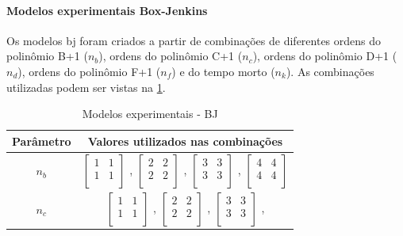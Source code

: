 \paragraph*{\textbf{Modelos experimentais Box-Jenkins}}
\label{par:modelos_experimentais_bj}

Os modelos \acrshort{bj} foram criados a partir de combinações de diferentes ordens do polinômio B+1 ($n_b$),
ordens do polinômio C+1 ($n_c$), ordens do polinômio D+1 ($n_d$), ordens do polinômio F+1 ($n_f$)
e do tempo morto ($n_k$). As combinações utilizadas podem ser vistas na
\cref{tab:tclabsp-models-bj}.

\begin{table}[h]
	\centering
	\caption{Modelos experimentais - BJ}
	\label{tab:tclabsp-models-bj}
	\begin{tabular}{c|c} \toprule
		{Parâmetro}		&	{Valores utilizados nas combinações}									\\ \midrule
		$n_b$			&
							$ \begin{bmatrix}	1	&	1	\\	1	&	1	\\	\end{bmatrix} $	,		
							$ \begin{bmatrix}	2	&	2	\\	2	&	2	\\	\end{bmatrix} $	,		
							$ \begin{bmatrix}	3	&	3	\\	3	&	3	\\	\end{bmatrix} $	,		
							$ \begin{bmatrix}	4	&	4	\\	4	&	4	\\	\end{bmatrix} $		\\ \midrule
		$n_c$			&
							$ \begin{bmatrix}	1	&	1	\\	1	&	1	\\	\end{bmatrix} $	,		
							$ \begin{bmatrix}	2	&	2	\\	2	&	2	\\	\end{bmatrix} $	,		
							$ \begin{bmatrix}	3	&	3	\\	3	&	3	\\	\end{bmatrix} $	,		

\end{tabular}
\end{table}
